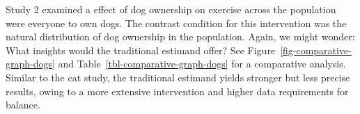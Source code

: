 \documentclass[
  singlecolumn,
  9pt]{article}
\begin{document}
\begin{table}

\caption{\label{tbl-comparative-graph-dogs}A comparison of the classical
causal estimand with the shift estimand employed in this study: dogs and
exercise}


\end{table}%

Study 2 examined a effect of dog ownership on exercise across the
population were everyone to own dogs. The contrast condition for this
intervention was the natural distribution of dog ownership in the
population. Again, we might wonder: What insights would the traditional
estimand offer? See Figure~\ref{fig-comparative-graph-dogs} and
Table~\ref{tbl-comparative-graph-dogs} for a comparative analysis.
Similar to the cat study, the traditional estimand yields stronger but
less precise results, owing to a more extensive intervention and higher
data requirements for balance.
\end{document}
